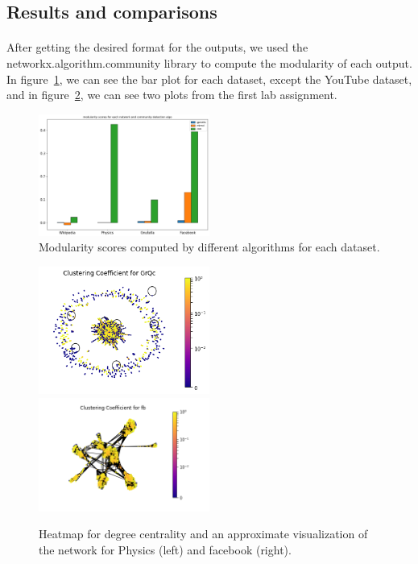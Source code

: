 \documentclass[letterpaper, 11pt]{article}
\newcommand{\1}{\mathds{1}}	%
\theoremstyle{definition}
\begin{document}
\subsection*{Results and comparisons}
\paragraph{}After getting the desired format for the outputs, we used the networkx.algorithm.community library to compute the modularity of each output. In figure~\ref{fig:mod500}, we can see the bar plot for each dataset, except the YouTube dataset, and in figure~\ref{fig:clustering}, we can see two plots from the first lab assignment. 

\begin{figure}[h]
\centering
\includegraphics[width=0.5\textwidth]{output500.png}
\captionsetup{justification=centering,margin=0.5cm}
\caption{Modularity scores computed by different algorithms for each dataset.}
\label{fig:mod500}
\end{figure}

\begin{figure}[h]
\includegraphics[width=0.5\textwidth]{GrQc_clustering.png}
\includegraphics[width=0.5\textwidth]{fb_clustering.png}
\captionsetup{justification=centering,margin=0.5cm}
\caption{Heatmap for degree centrality and an approximate visualization of the network for Physics (left) and facebook (right).}
\label{fig:clustering}
\end{figure}
\end{document}

